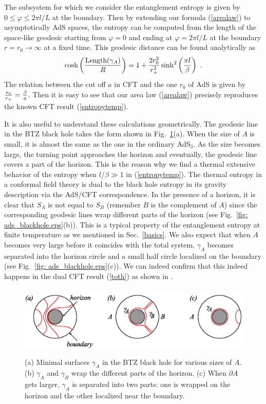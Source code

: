 \documentclass[12pt]{article}
\def\frac#1#2{{#1\over #2}}
\def\de{\partial}
\def\f {\frac}
\def\vp{\varphi}
\def\frac#1#2{{#1\over #2}}
\def\be{\begin{equation}}
\def\ee{\end{equation}}
\begin{document}
The subsystem for which we consider the entanglement entropy is
given by $0\leq \vp\leq 2\pi l/L$ at the boundary. Then by extending
our formula (\ref{arealaw}) to asymptotically AdS spaces,
 the entropy can be computed from the
length of the space-like geodesic starting from $\vp=0$ and ending
at $\vp=2\pi l/L$ at the boundary $r=r_0\to \infty$ at a fixed time.
This geodesic distance can be found analytically as
\be \cosh\left(\f{\mbox{Length}(\gamma_A)}{R}\right)
=1+\f{2r_0^2}{r_+^2}\sinh^2\left(\f{\pi
l}{\beta}\right) \ .\label{delltwo} \ee
The relation between the cut off $a$ in CFT and
the one $r_0$ of AdS is given by $\f{r_0}{r_+}=\f{\beta}{a}$.
Then it is easy to see that our area law
(\ref{arealaw}) precisely reproduces the known CFT result
(\ref{entropytemp}).

It is also useful to understand these calculations geometrically.
The geodesic line in the BTZ black hole takes the form shown in
Fig.\ \ref{fig: ads_blackhole.eps}(a). When the size of $A$ is
small, it is almost the same as the one in the ordinary AdS$_3$. As
the size becomes large, the turning point approaches the horizon and
eventually, the geodesic line covers a part of the horizon. This is
the reason why we find a thermal extensive behavior of the entropy when
$l/\beta\gg 1$ in (\ref{entropytemp}). The thermal entropy in a
conformal field theory is dual to the black hole entropy in its
gravity description via the AdS/CFT correspondence. In the presence
of a horizon, it is clear that $S_A$ is not equal to $S_B$ (remember
$B$ is the complement of $A$) since the corresponding geodesic lines
wrap different parts of the horizon (see Fig.\ \ref{fig:
ads_blackhole.eps}(b)).
This is a typical property of
the entanglement entropy at finite temperature
as we mentioned in Sec.\ \ref{basics}.
We also expect that when $A$ becomes very large before it coincides
with the total system, $\gamma_A$ becomes separated into the horizon circle and
a small half circle localized on the boundary  (see Fig.\ \ref{fig:
ads_blackhole.eps}(c)). We can indeed confirm that this indeed happens in
the dual CFT result (\ref{toth}) as shown in \cite{Azeyanagi:2007bj}.


\begin{figure}
\begin{center}
\includegraphics[height=3.4cm,clip]{ads_blackhole.eps}
\end{center}
\caption{ \label{fig: ads_blackhole.eps} (a) Minimal surfaces
$\gamma_A$ in the BTZ black hole for various sizes of $A$. (b)
$\gamma_A$ and $\gamma_B$ wrap the different parts of the horizon.
(c) When $\de A$ gets larger, $\gamma_A$ is separated into
two parts: one is wrapped on the horizon and the other localized near the boundary.}
\end{figure}
\end{document}
